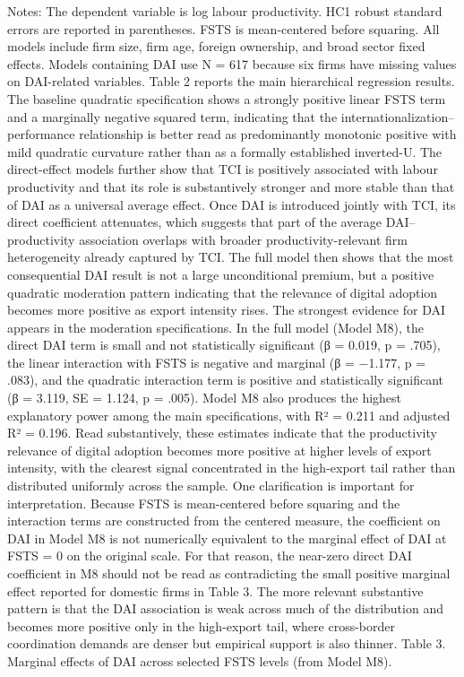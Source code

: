 \documentclass[12pt,a4paper]{article}
\begin{document}
Notes: The dependent variable is log labour productivity. HC1 robust
standard errors are reported in parentheses. FSTS is mean-centered
before squaring. All models include firm size, firm age, foreign
ownership, and broad sector fixed effects. Models containing DAI use N =
617 because six firms have missing values on DAI-related variables.
Table 2 reports the main hierarchical regression results. The baseline
quadratic specification shows a strongly positive linear FSTS term and a
marginally negative squared term, indicating that the
internationalization--performance relationship is better read as
predominantly monotonic positive with mild quadratic curvature rather
than as a formally established inverted-U. The direct-effect models
further show that TCI is positively associated with labour productivity
and that its role is substantively stronger and more stable than that of
DAI as a universal average effect. Once DAI is introduced jointly with
TCI, its direct coefficient attenuates, which suggests that part of the
average DAI--productivity association overlaps with broader
productivity-relevant firm heterogeneity already captured by TCI. The
full model then shows that the most consequential DAI result is not a
large unconditional premium, but a positive quadratic moderation pattern
indicating that the relevance of digital adoption becomes more positive
as export intensity rises. The strongest evidence for DAI appears in the
moderation specifications. In the full model (Model M8), the direct DAI
term is small and not statistically significant (β = 0.019, p = .705),
the linear interaction with FSTS is negative and marginal (β = −1.177, p
= .083), and the quadratic interaction term is positive and
statistically significant (β = 3.119, SE = 1.124, p = .005). Model M8
also produces the highest explanatory power among the main
specifications, with R² = 0.211 and adjusted R² = 0.196. Read
substantively, these estimates indicate that the productivity relevance
of digital adoption becomes more positive at higher levels of export
intensity, with the clearest signal concentrated in the high-export tail
rather than distributed uniformly across the sample. One clarification
is important for interpretation. Because FSTS is mean-centered before
squaring and the interaction terms are constructed from the centered
measure, the coefficient on DAI in Model M8 is not numerically
equivalent to the marginal effect of DAI at FSTS = 0 on the original
scale. For that reason, the near-zero direct DAI coefficient in M8
should not be read as contradicting the small positive marginal effect
reported for domestic firms in Table 3. The more relevant substantive
pattern is that the DAI association is weak across much of the
distribution and becomes more positive only in the high-export tail,
where cross-border coordination demands are denser but empirical support
is also thinner. Table 3. Marginal effects of DAI across selected FSTS
levels (from Model M8).
\end{document}
